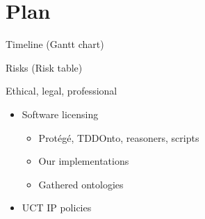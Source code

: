 \documentclass[17pt,mathserif]{beamer}
\begin{document}
\section{Plan}

\begin{frame}{Timeline}
  (Gantt chart)
\end{frame}

\begin{frame}{Risks}
  (Risk table)
\end{frame}

\begin{frame}{Ethical, legal, professional}
  \begin{itemize}
    \item Software licensing
    \begin{itemize}
      \item Prot\'eg\'e, TDDOnto, reasoners, scripts
      \item Our implementations
      \item Gathered ontologies
    \end{itemize}
    \item UCT IP policies
  \end{itemize}
\end{frame}
\end{document}
